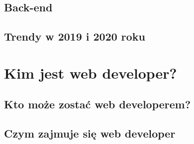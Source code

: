 \documentclass[12pt]{report}
\begin{document}
	\section{Back-end}
	\newpage
	\section{Trendy w 2019 i 2020 roku}


	\newpage
	\chapter{Kim jest web developer?}
	\section{Kto może zostać web developerem?}
	\newpage
	\section{Czym zajmuje się web developer}

	
\end{document}
